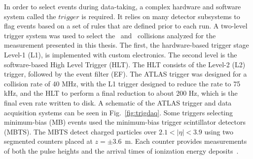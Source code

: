 In order to select events during data-taking, a complex hardware and software system called the $trigger$ is required. It relies on many detector subsystems to flag events based on a set of rules that are defined prior to each run. A two-level trigger system was used to select the \pp\ and \pPb\ collisions analyzed for the measurement presented in this thesis. The first, the hardware-based trigger stage Level-1 (L1), is implemented with custom electronics. The second level is the software-based High Level Trigger (HLT). The HLT consists of the Level-2 (L2) trigger, followed by the event filter (EF). The ATLAS trigger was designed for a collision rate of 40 MHz, with the L1 trigger designed to reduce the rate to 75 kHz, and the HLT to perform a final reduction to about 200 Hz, which is the final even rate written to disk. A schematic of the ATLAS trigger and data acquisition systems can be seen in Fig.~\ref{fig:trigdaq}. Some triggers selecting minimum-bias (MB) events used the minimum-bias trigger scintillator detectors (MBTS). The MBTS detect charged particles over $2.1 < |\eta| < 3.9$ using two segmented counters placed at $z = \pm 3.6$~m. Each counter provides measurements of both the pulse heights and the arrival times of ionization energy deposits~\cite{Aad:2008zzm}.

